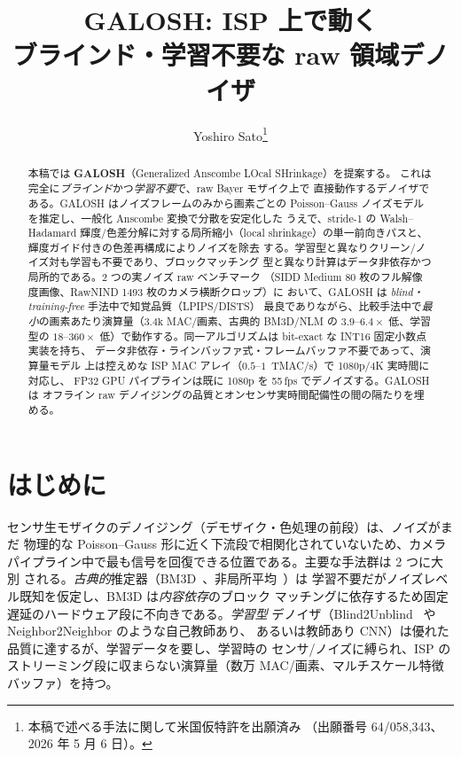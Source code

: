 \documentclass[twocolumn,10pt]{ltjsarticle}
\title{\textbf{GALOSH: ISP 上で動く\\ブラインド・学習不要な raw 領域デノイザ}}
\author{Yoshiro Sato\thanks{本稿で述べる手法に関して米国仮特許を出願済み
（出願番号 64/058,343、2026 年 5 月 6 日）。}}
\date{}
\begin{document}
\maketitle

\begin{abstract}
本稿では \textbf{GALOSH}（Generalized Anscombe LOcal SHrinkage）を提案する。
これは完全に\emph{ブラインド}かつ\emph{学習不要}で、raw Bayer モザイク上で
直接動作するデノイザである。GALOSH はノイズフレームのみから画素ごとの
Poisson--Gauss ノイズモデルを推定し、一般化 Anscombe 変換で分散を安定化した
うえで、stride-1 の Walsh--Hadamard 輝度/色差分解に対する局所縮小（local
shrinkage）の単一前向きパスと、輝度ガイド付きの色差再構成によりノイズを除去
する。学習型と異なりクリーン/ノイズ対も学習も不要であり、ブロックマッチング
型と異なり計算はデータ非依存かつ局所的である。2 つの実ノイズ raw ベンチマーク
（SIDD Medium 80 枚のフル解像度画像、RawNIND 1493 枚のカメラ横断クロップ）に
おいて、GALOSH は \emph{blind・training-free} 手法中で知覚品質（LPIPS/DISTS）
最良でありながら、比較手法中で\emph{最小}の画素あたり演算量（$3.4\text{k}$
MAC/画素、古典的 BM3D/NLM の $3.9$--$6.4\times$ 低、学習型の $18$--$360\times$
低）で動作する。同一アルゴリズムは bit-exact な INT16 固定小数点実装を持ち、
データ非依存・ラインバッファ式・フレームバッファ不要であって、演算量モデル
上は控えめな ISP MAC アレイ（$0.5$--$1$~TMAC/s）で 1080p/4K 実時間に対応し、
FP32 GPU パイプラインは既に 1080p を 55\,fps でデノイズする。GALOSH は
オフライン raw デノイジングの品質とオンセンサ実時間配備性の間の隔たりを埋める。
\end{abstract}

\section{はじめに}
センサ生モザイクのデノイジング（デモザイク・色処理の前段）は、ノイズがまだ
物理的な Poisson--Gauss 形に近く下流段で相関化されていないため、カメラ
パイプライン中で最も信号を回復できる位置である。主要な手法群は 2 つに大別
される。\emph{古典的}推定器（BM3D~\cite{bm3d}、非局所平均~\cite{nlm}）は
学習不要だがノイズレベル既知を仮定し、BM3D は\emph{内容依存}のブロック
マッチングに依存するため固定遅延のハードウェア段に不向きである。\emph{学習型}
デノイザ（Blind2Unblind~\cite{b2u} や Neighbor2Neighbor のような自己教師あり、
あるいは教師あり CNN）は優れた品質に達するが、学習データを要し、学習時の
センサ/ノイズに縛られ、ISP のストリーミング段に収まらない演算量（数万
MAC/画素、マルチスケール特徴バッファ）を持つ。
\end{document}
